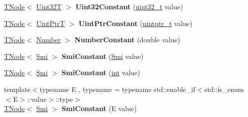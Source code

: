 \begin{DoxyCompactItemize}
\mbox{\hyperlink{classv8_1_1internal_1_1compiler_1_1TNode}{T\+Node}}$<$ \mbox{\hyperlink{structv8_1_1internal_1_1Uint32T}{Uint32T}} $>$ {\bfseries Uint32\+Constant} (\mbox{\hyperlink{classuint32__t}{uint32\+\_\+t}} value)
\item 
\mbox{\label{classv8_1_1internal_1_1compiler_1_1CodeAssembler_ae3ea07b4d38fe66cf7740ba2c613e4c1}} 
\mbox{\hyperlink{classv8_1_1internal_1_1compiler_1_1TNode}{T\+Node}}$<$ \mbox{\hyperlink{structv8_1_1internal_1_1UintPtrT}{Uint\+PtrT}} $>$ {\bfseries Uint\+Ptr\+Constant} (\mbox{\hyperlink{classuintptr__t}{uintptr\+\_\+t}} value)
\item 
\mbox{\label{classv8_1_1internal_1_1compiler_1_1CodeAssembler_ae051d1d0b90c4641430f1fd92b23538b}} 
\mbox{\hyperlink{classv8_1_1internal_1_1compiler_1_1TNode}{T\+Node}}$<$ \mbox{\hyperlink{structv8_1_1internal_1_1UnionT}{Number}} $>$ {\bfseries Number\+Constant} (double value)
\item 
\mbox{\label{classv8_1_1internal_1_1compiler_1_1CodeAssembler_a57cf16848c2be283bb18e0d649471b76}} 
\mbox{\hyperlink{classv8_1_1internal_1_1compiler_1_1TNode}{T\+Node}}$<$ \mbox{\hyperlink{classv8_1_1internal_1_1Smi}{Smi}} $>$ {\bfseries Smi\+Constant} (\mbox{\hyperlink{classv8_1_1internal_1_1Smi}{Smi}} value)
\item 
\mbox{\label{classv8_1_1internal_1_1compiler_1_1CodeAssembler_a6bd8c0dbc00f4bf84c26aee2fa941458}} 
\mbox{\hyperlink{classv8_1_1internal_1_1compiler_1_1TNode}{T\+Node}}$<$ \mbox{\hyperlink{classv8_1_1internal_1_1Smi}{Smi}} $>$ {\bfseries Smi\+Constant} (\mbox{\hyperlink{classint}{int}} value)
\item 
\mbox{\label{classv8_1_1internal_1_1compiler_1_1CodeAssembler_a31c429be05609733f144e5058e31b52f}} 
{\footnotesize template$<$typename E , typename  = typename std\+::enable\+\_\+if$<$std\+::is\+\_\+enum$<$\+E$>$\+::value$>$\+::type$>$ }\\\mbox{\hyperlink{classv8_1_1internal_1_1compiler_1_1TNode}{T\+Node}}$<$ \mbox{\hyperlink{classv8_1_1internal_1_1Smi}{Smi}} $>$ {\bfseries Smi\+Constant} (E value)
\item 

\end{DoxyCompactItemize}
